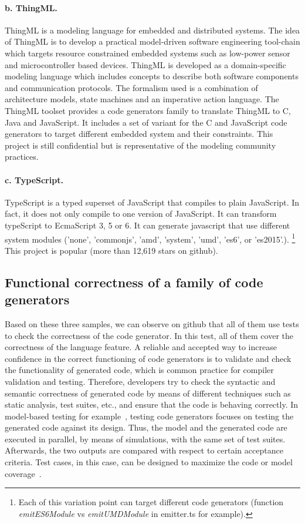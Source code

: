 \paragraph{b. ThingML.} ThingML is a modeling language for embedded and distributed systems. The idea of ThingML is to develop a practical model-driven software engineering tool-chain which targets resource constrained embedded systems such as low-power sensor and microcontroller based devices. ThingML is developed as a domain-specific modeling language which includes concepts to describe both software components and communication protocols. The formalism used is a combination of architecture models, state machines and an imperative action language. The ThingML toolset provides a  code generators family  to translate ThingML to C, Java and JavaScript. It includes a set of variant for the C and JavaScript code generators to target different embedded system and their constraints. 
This project is still confidential but is representative of the modeling community practices.
 
\paragraph{c. TypeScript.} TypeScript is a typed superset of JavaScript that compiles to plain JavaScript. In fact, it does not only compile to one version of JavaScript. It can transform typeScript to EcmaScript 3, 5 or 6. It can generate javascript that use different system modules ('none', 'commonjs', 'amd', 'system', 'umd', 'es6', or 'es2015'.). \footnote{Each of this variation point can target different code generators (function \textit{emitES6Module} vs \textit{emitUMDModule} in emitter.ts for example).} This project is popular (more than 12,619 stars on github).


\subsection{Functional  correctness of a family of code generators}


Based on these three samples, we can observe on github that all of them use tests to check the correctness of the code generator. In this test, all of them cover the correctness of the language feature.  A reliable and accepted way to increase confidence in the correct functioning of code generators is to validate and check the functionality of generated code, which is common practice for compiler validation and testing.
Therefore, developers try to check the syntactic and semantic correctness of generated code by means of different techniques such as static analysis, test suites, etc., and ensure that the code is behaving correctly.  In model-based testing for example~\cite{jorges2014back,stuermer2007systematic}, testing code generators focuses on testing the generated code against its design. Thus, the model and the generated code are executed in parallel, by means of simulations, with the same set of test suites. Afterwards, the two outputs are compared with respect to certain acceptance criteria. Test cases, in this case, can be designed to maximize the code or model coverage~\cite{sturmer2005overview}.

